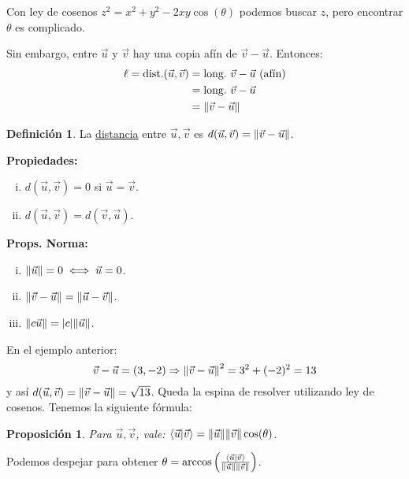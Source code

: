 \documentclass[12pt]{article}
\theoremstyle{plain}
\newtheorem{Prop}[Th]{Proposición}     %
\theoremstyle{definition}
\newtheorem*{Def}{Definición}       %
\theoremstyle{remark}
\renewcommand{\:}{\colon}           %
\newcommand{\un}[1]{\underline{#1}}
\renewcommand{\.}{\Cdot}                %
\newcommand{\To}{\Rightarrow}
\begin{document}
\begin{multicols}{2}
\begin{center}
\begin{tikzpicture}[x=0.75pt,y=0.75pt,yscale=-1,xscale=1]
\end{tikzpicture}
\end{center}
\vspace{-0.8em}
Con ley de cosenos \un{$z^2=x^2+y^2-2xy\cos(\theta)$}
podemos buscar $z$, pero encontrar $\theta$ es complicado.\par 
Sin embargo, entre $\vec{u}$ y $\vec{v}$ hay una copia afín de $\vec{v}-\vec{u}$. Entonces:
\begin{align*}
  \ell=\text{dist.}(\vec{u},\vec{v})&=\text{long.}\ \vec{v}-\vec{u}\ \text{(afín)}\\
  &=\text{long.}\ \vec{v}-\vec{u}\\
  &=\norm{\vec{v}-\vec{u}}
\end{align*}
\begin{Def}
La \un{distancia} entre $\vec{u},\vec{v}$ es $d(\vec{u},\vec{v})=\norm{\vec v-\vec u}$.
\end{Def}
\begin{multicols}{2}
  \textbf{Propiedades:}
\vspace{-0.5em}
\begin{enumerate}[i)]
  \itemsep=-0.35em
  \item $d(\vec{u},\vec v)=0$ si $\vec{u}=\vec v$.
  \item $d(\vec{u},\vec v)=d(\vec{v},\vec u)$.
\end{enumerate}
\columnbreak
\textbf{Props. Norma:}
\vspace{-0.8em}
\begin{enumerate}[i)]
  \itemsep=-0.35em
  \item $\norm{\vec u}=0\iff\vec{u}=0$.
  \item $\norm{\vec v-\vec u}=\norm{\vec u-\vec v}$.
  \item $\norm{c\vec u}=|c|\norm{\vec u}$.
\end{enumerate}
\end{multicols}
En el ejemplo anterior:
$$\vec{v}-\vec{u}=(3,-2)\To\norm{\vec{v}-\vec{u}}^2=3^2+(-2)^2=13$$
y así $d(\vec{u},\vec{v})=\norm{\vec{v}-\vec{u}}=\sqrt{13}$.
\newpage
Queda la espina de resolver utilizando ley de cosenos. Tenemos la siguiente fórmula:

\begin{Prop}
Para $\vec{u},\vec v$, vale: \un{$\braket{\vec{u}}{\vec{v}}=\norm{\vec{u}}\norm{\vec v}\cos(\theta)$}.
\end{Prop}
\vspace*{-0.3em}
Podemos despejar para obtener \un{$\theta=\arccos\left(\frac{\braket{\vec{u}}{\vec{v}}}{\norm{\vec{u}}\norm{\vec v}}\right)$}.


\end{multicols}
\end{document}
